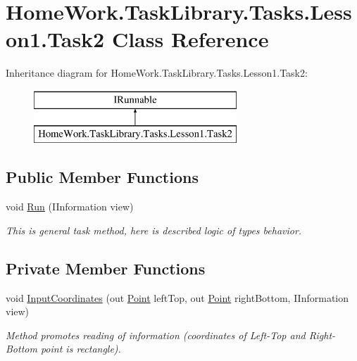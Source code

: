 \hypertarget{class_home_work_1_1_task_library_1_1_tasks_1_1_lesson1_1_1_task2}{}\section{Home\+Work.\+Task\+Library.\+Tasks.\+Lesson1.\+Task2 Class Reference}
\label{class_home_work_1_1_task_library_1_1_tasks_1_1_lesson1_1_1_task2}
Inheritance diagram for Home\+Work.\+Task\+Library.\+Tasks.\+Lesson1.\+Task2\+:\begin{figure}[H]
\begin{center}
\leavevmode
\includegraphics[height=2.000000cm]{class_home_work_1_1_task_library_1_1_tasks_1_1_lesson1_1_1_task2}
\end{center}
\end{figure}
\subsection*{Public Member Functions}
\begin{DoxyCompactItemize}
\item 
void \mbox{\hyperlink{class_home_work_1_1_task_library_1_1_tasks_1_1_lesson1_1_1_task2_a7f1bda847f3657fac07cc8f57a243a7b}{Run}} (I\+Information view)
\begin{DoxyCompactList}\small\item\em This is general task method, here is described logic of types behavior. \end{DoxyCompactList}\end{DoxyCompactItemize}
\subsection*{Private Member Functions}
\begin{DoxyCompactItemize}
\item 
void \mbox{\hyperlink{class_home_work_1_1_task_library_1_1_tasks_1_1_lesson1_1_1_task2_a5990f69c98539fb0e5fbe612e657e272}{Input\+Coordinates}} (out \mbox{\hyperlink{struct_home_work_1_1_task_library_1_1_tasks_1_1_lesson1_1_1_classes_1_1_point}{Point}} left\+Top, out \mbox{\hyperlink{struct_home_work_1_1_task_library_1_1_tasks_1_1_lesson1_1_1_classes_1_1_point}{Point}} right\+Bottom, I\+Information view)
\begin{DoxyCompactList}\small\item\em Method promotes reading of information (coordinates of Left-\/\+Top and Right-\/\+Bottom point is rectangle). \end{DoxyCompactList}\end{DoxyCompactItemize}


